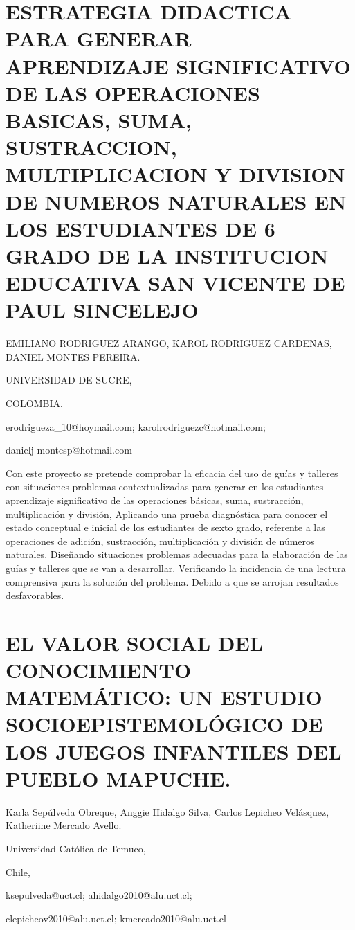 \section{ESTRATEGIA DIDACTICA PARA GENERAR APRENDIZAJE SIGNIFICATIVO DE LAS
OPERACIONES BASICAS, SUMA, SUSTRACCION, MULTIPLICACION Y DIVISION
DE NUMEROS NATURALES EN LOS ESTUDIANTES DE 6\textdegree{} GRADO DE
LA INSTITUCION EDUCATIVA SAN VICENTE DE PAUL SINCELEJO }

\begin{datos}

EMILIANO RODRIGUEZ ARANGO, KAROL RODRIGUEZ CARDENAS, DANIEL MONTES
PEREIRA.

UNIVERSIDAD DE SUCRE,

COLOMBIA,

erodrigueza\_10@hoymail.com; karolrodriguezc@hotmail.com;

danielj-montesp@hotmail.com

\end{datos}

Con este proyecto se pretende comprobar la eficacia del uso de guías
y talleres con situaciones problemas contextualizadas para generar
en los estudiantes aprendizaje significativo de las operaciones básicas,
suma, sustracción, multiplicación y división, Aplicando una prueba
diagnóstica para conocer el estado conceptual e inicial de los estudiantes
de sexto grado, referente a las operaciones de adición, sustracción,
multiplicación y división de números naturales. Diseñando situaciones
problemas adecuadas para la elaboración de las guías y talleres que
se van a desarrollar. Verificando la incidencia de una lectura comprensiva
para la solución del problema. Debido a que se arrojan resultados
desfavorables.


\section{EL VALOR SOCIAL DEL CONOCIMIENTO MATEMÁTICO: UN ESTUDIO SOCIOEPISTEMOLÓGICO
DE LOS JUEGOS INFANTILES DEL PUEBLO MAPUCHE.}

\begin{datos}

Karla Sepúlveda Obreque, Anggie Hidalgo Silva, Carlos Lepicheo Velásquez,
Katheriine Mercado Avello.

Universidad Católica de Temuco, 

Chile,

ksepulveda@uct.cl; ahidalgo2010@alu.uct.cl; 

clepicheov2010@alu.uct.cl; kmercado2010@alu.uct.cl 

\end{datos}

